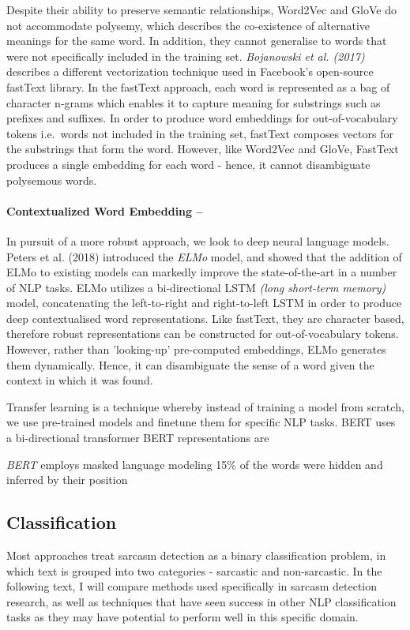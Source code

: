 \documentclass[12pt,a4paper]{article}
\begin{document}
Despite their ability to preserve semantic relationships, Word2Vec and GloVe do not accommodate polysemy, which describes the co-existence of alternative meanings for the same word. In addition, they cannot generalise to words that were not specifically included in the training set. \textit{Bojanowski et al. (2017)} \cite{bojanowski2016enriching} describes a different vectorization technique used in Facebook's open-source fastText library. In the fastText approach, each word is represented as a bag of character n-grams which enables it to capture meaning for substrings such as prefixes and suffixes. In order to produce word embeddings for out-of-vocabulary tokens i.e.\ words not included in the training set, fastText composes vectors for the substrings that form the word. However, like Word2Vec and GloVe, FastText produces a single embedding for each word - hence, it cannot disambiguate polysemous words.

\paragraph{Contextualized Word Embedding --}
In pursuit of a more robust approach, we look to deep neural language models. Peters et al. (2018) \cite{peters2018deep} introduced the \textit{ELMo} model, and showed that the addition of ELMo to existing models can markedly improve the state-of-the-art in a number of NLP tasks. ELMo utilizes a bi-directional LSTM \textit{(long short-term memory)} model, concatenating the left-to-right and right-to-left LSTM in order to produce deep contextualised word representations. Like fastText, they are character based, therefore robust representations can be constructed for out-of-vocabulary tokens. However, rather than 'looking-up' pre-computed embeddings, ELMo generates them dynamically. Hence, it can disambiguate the sense of a word given the context in which it was found. 



Transfer learning is a technique whereby instead of training a model from scratch, we use pre-trained models and finetune them for specific NLP tasks.
BERT uses a bi-directional transformer
BERT representations are 

 \textit{BERT} \cite{devlin2018bert}
 employs masked language modeling
 15\% of the words were hidden and inferred by their position

\vfill

\subsection{Classification}
\noindent Most approaches treat sarcasm detection as a binary classification problem, in which text is grouped into two categories - sarcastic and non-sarcastic. In the following text, I will compare methods used specifically in sarcasm detection research, as well as techniques that have seen success in other NLP classification tasks as they may have potential to perform well in this specific domain. \\
\end{document}
